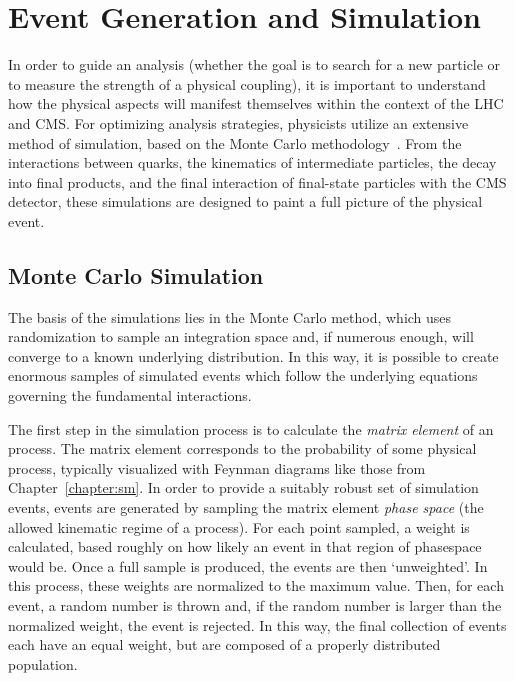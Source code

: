 \chapter{Event Generation and Simulation}
\label{chapter:eventGenSim}

In order to guide an analysis (whether the goal is to search for a new particle
or to measure the strength of a physical coupling), it is important to
understand how the physical aspects will manifest themselves within the context
of the LHC and CMS. For optimizing analysis strategies, physicists utilize an
extensive method of simulation, based on the Monte Carlo
methodology~\cite{MCMethod}. From the interactions between quarks, the
kinematics of intermediate particles, the decay into final products, and the
final interaction of final-state particles with the CMS detector, these
simulations are designed to paint a full picture of the physical event.

\section{Monte Carlo Simulation}
\label{sec:mcSim}
The basis of the simulations lies in the Monte Carlo method, which
uses randomization to sample an integration space and, if numerous enough, will
converge to a known underlying distribution. In this way, it is possible to
create enormous samples of simulated events which follow the underlying
equations governing the fundamental interactions. 

The first step in the simulation process is to calculate the \emph{matrix
element} of an process. The matrix element corresponds to the probability of
some physical process, typically visualized with Feynman diagrams like those
from Chapter~\ref{chapter:sm}.  In order to provide a suitably robust set of
simulation events, events are generated by sampling the matrix element
\emph{phase space} (the allowed kinematic regime of a process). For each point
sampled, a weight is calculated, based roughly on how likely an event in that
region of phasespace would be. Once a full sample is produced, the events are
then `unweighted'. In this process, these weights are normalized to
the maximum value. Then, for each event, a random number is thrown and, if the
random number is larger than the normalized weight, the event is rejected. In
this way, the final collection of events each have an equal weight, but are
composed of a properly distributed population.

